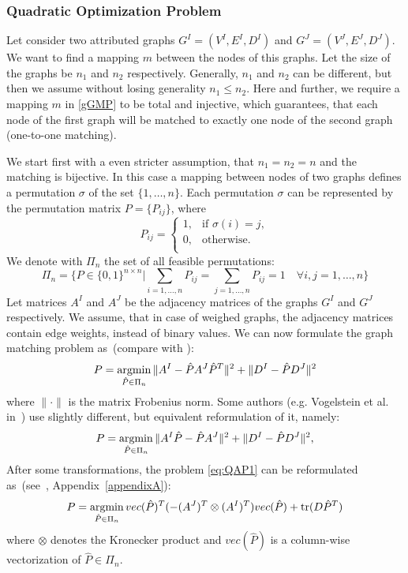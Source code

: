 \subsubsection{Quadratic Optimization Problem}
Let consider two attributed graphs $G^I = (V^I, E^I,D^I)$ and $G^J = (V^J, E^J,D^J)$. We want to find a mapping $m$ between the nodes of this graphs. Let the size of the graphs be $n_1$ and $n_2$ respectively. Generally, $n_1$ and $n_2$ can be different, but then we assume without losing generality $n_1\le n_2$. Here and further, we require a mapping $m$ in \eqref{gGMP} to be total and injective, which guarantees, that each node of the first graph will be matched to exactly one node of the second graph (one-to-one matching). 

We start first with a even stricter assumption, that $n_1=n_2=n$ and the matching is bijective. In this case a mapping between nodes of two graphs defines a permutation $\sigma$ of the set $\{1,\dots,n\}$. Each permutation $\sigma$ can be represented by the permutation matrix $P=\{P_{ij}\}$, where
\begin{equation*}
P_{ij}=\begin{cases}
 1, & \text{if } \sigma(i)=j, \\
 0, & \text{otherwise.} \\
\end{cases}
\end{equation*}
We denote with $\Pi_n$ the set of all feasible permutations:
\begin{equation*}
\Pi_n=\{P\in\{0,1\}^{n\times n}|\sum_{i=1,\dots,n}P_{ij}=\sum_{j=1,\dots,n}P_{ij}=1\quad\forall i,j=1,\dots,n\}
\end{equation*}
Let matrices $A^I$ and $A^J$ be the adjacency matrices of the graphs $G^I$ and $G^J$ respectively. We assume, that in case of weighed graphs, the adjacency matrices contain edge weights, instead of binary values. We can now formulate the graph matching problem as~(compare with \cite{Herault1990_SimulatedAnnealing,FastPFP,Lyzinski2015,Roth2001,Umeyam1988,Zazlavskiy2008_PATH}):
\begin{equation} \label{eq:QAP1}
P = \mathop{\rm argmin}_{\hat{P}\in\Pi_n}\|A^I-\hat{P}A^J\hat{P}^T\|^2+\|D^I-\hat{P}D^J\|^2
\end{equation}
where $\|\cdot\|$ is the matrix Frobenius norm. Some authors (e.g. Vogelstein et al. in~\cite{Vogelstein_BrainGraphs}) use slightly different, but equivalent reformulation of it, namely:
\begin{equation} \label{eq:QAP2}
P = \mathop{\rm argmin}_{\hat{P}\in\Pi_n}\|A^I\hat{P}-\hat{P}A^J\|^2+\|D^I-\hat{P}D^J\|^2,
\end{equation}
After some transformations, the problem \eqref{eq:QAP1} can be reformulated as~(see~\cite{Burkard98thequadratic}, Appendix~\ref{appendixA}):
\begin{equation} \label{eq:QAP3}
P = \mathop{\rm argmin}_{\hat{P}\in\Pi_n}vec(\hat{P})^T(-(A^J)^T\otimes(A^I)^T)vec(\hat{P})+\mathop{\rm tr}(D\hat{P}^T)
\end{equation}
where $\otimes$ denotes the Kronecker product and $vec(\hat{P})$ is a column-wise vectorization of $\hat{P}\in\Pi_n$.


